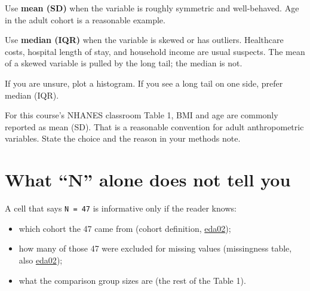 \documentclass[
  letterpaper,
  DIV=11,
  numbers=noendperiod,
  oneside]{scrreprt}
\providecommand{\tightlist}{%
  \setlength{\itemsep}{0pt}\setlength{\parskip}{0pt}}
\begin{document}

Use \textbf{mean (SD)} when the variable is roughly symmetric and
well-behaved. Age in the adult cohort is a reasonable example.

Use \textbf{median (IQR)} when the variable is skewed or has outliers.
Healthcare costs, hospital length of stay, and household income are
usual suspects. The mean of a skewed variable is pulled by the long
tail; the median is not.

If you are unsure, plot a histogram. If you see a long tail on one side,
prefer median (IQR).

\begin{tcolorbox}[enhanced jigsaw, title=\textcolor{quarto-callout-tip-color}{\faLightbulb}\hspace{0.5em}{Tip}, arc=.35mm, toptitle=1mm, colframe=quarto-callout-tip-color-frame, toprule=.15mm, leftrule=.75mm, bottomtitle=1mm, opacityback=0, bottomrule=.15mm, coltitle=black, breakable, opacitybacktitle=0.6, titlerule=0mm, colback=white, left=2mm, colbacktitle=quarto-callout-tip-color!10!white, rightrule=.15mm]

For this course's NHANES classroom Table 1, BMI and age are commonly
reported as mean (SD). That is a reasonable convention for adult
anthropometric variables. State the choice and the reason in your
methods note.

\end{tcolorbox}

\section*{What ``N'' alone does not tell
you}\label{what-n-alone-does-not-tell-you}


A cell that says \texttt{N\ =\ 47} is informative only if the reader
knows:

\begin{itemize}
\tightlist
\item
  which cohort the 47 came from (cohort definition,
  \hyperref[cohort-and-missingness]{eda02});
\item
  how many of those 47 were excluded for missing values (missingness
  table, also \hyperref[cohort-and-missingness]{eda02});
\item
  what the comparison group sizes are (the rest of the Table 1).
\end{itemize}
\end{document}
